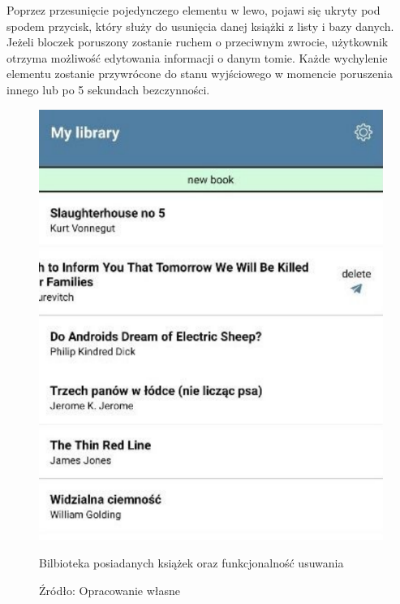 Poprzez przesunięcie pojedynczego elementu w lewo, pojawi się ukryty pod spodem przycisk, który służy do usunięcia danej książki z listy i bazy danych. Jeżeli bloczek poruszony zostanie ruchem o przeciwnym zwrocie, użytkownik otrzyma możliwość edytowania informacji o danym tomie.
Każde wychylenie elementu zostanie przywrócone do stanu wyjściowego w momencie poruszenia innego lub po 5 sekundach bezczynności.
\begin{figure}[H]
	\centering
	\includegraphics{mylib.pdf}
	\caption{\centering Bilbioteka posiadanych książek oraz funkcjonalność usuwania}
	\caption*{\centering Źródło: {Opracowanie własne}}
\end{figure}


